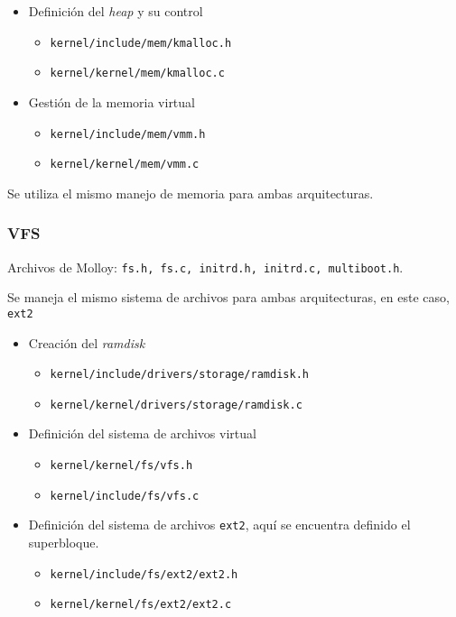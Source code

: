 		\begin{itemize} \setlength\itemsep{0pt}
			\item Definición del \textit{heap} y su control
			\begin{itemize} \setlength\itemsep{0pt}
				\item \texttt{kernel/include/mem/kmalloc.h}
				\item \texttt{kernel/kernel/mem/kmalloc.c}
			\end{itemize}
			
			\item Gestión de la memoria virtual
			\begin{itemize} \setlength\itemsep{0pt}
				\item \texttt{kernel/include/mem/vmm.h}
				\item \texttt{kernel/kernel/mem/vmm.c}
			\end{itemize}
			
		\end{itemize}
	
		Se utiliza el mismo manejo de memoria para ambas arquitecturas.
		
	
	
	
	\subsubsection{VFS}
		Archivos de Molloy: \texttt{fs.h, fs.c, initrd.h, initrd.c, multiboot.h}.
		
		Se maneja el mismo sistema de archivos para ambas arquitecturas, en este caso, \texttt{ext2}
		\begin{itemize} \setlength\itemsep{0pt}
			\item Creación del \textit{ramdisk}
			\begin{itemize} \setlength\itemsep{0pt}
				\item \texttt{kernel/include/drivers/storage/ramdisk.h}
				\item \texttt{kernel/kernel/drivers/storage/ramdisk.c}
			\end{itemize}
		
			\item Definición del sistema de archivos virtual
			\begin{itemize} \setlength\itemsep{0pt}
				\item \texttt{kernel/kernel/fs/vfs.h}
				\item \texttt{kernel/include/fs/vfs.c}
			\end{itemize}
		
			\item Definición del sistema de archivos \texttt{ext2}, aquí se encuentra definido el superbloque.
			\begin{itemize} \setlength\itemsep{0pt}
				\item \texttt{kernel/include/fs/ext2/ext2.h}
				\item \texttt{kernel/kernel/fs/ext2/ext2.c}
			\end{itemize}
		\end{itemize}
		
